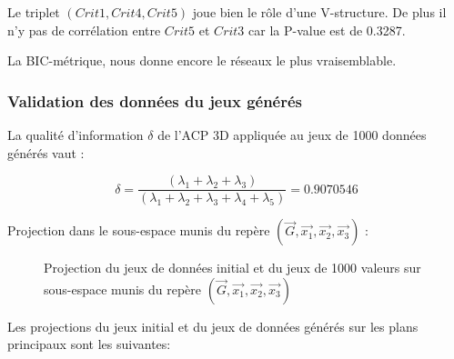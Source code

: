 \documentclass[a4paper]{article}
\begin{document}
\begin{appendices}
Le triplet $(Crit1,Crit4,Crit5)$ joue bien le rôle d'une V-structure. De plus il n'y pas de corrélation entre $Crit5$ et $Crit3$ car la P-value est de  0.3287.

La BIC-métrique, nous donne encore le réseaux le plus vraisemblable.

\subsubsection{Validation des données du jeux générés}

La qualité d'information $\delta$ de l'ACP 3D appliquée au jeux de 1000 données générés vaut  :

$$\delta=\frac{(\lambda_{1}+\lambda_{2}+\lambda_{3})}{(\lambda_{1}+\lambda_{2}+\lambda_{3}+\lambda_{4}+\lambda_{5})}=0.9070546$$

Projection dans le sous-espace munis du repère $(\vec{G},\vec{x_{1}},\vec{x_{2}},\vec{x_{3}})$ :

 \begin{figure}[H]
\hfill
{}
\caption{Projection du jeux de données initial et du jeux de 1000 valeurs sur sous-espace munis du repère $(\vec{G},\vec{x_{1}},\vec{x_{2}},\vec{x_{3}})$}\label{fig:somefiglabel}
\end{figure}

Les projections du jeux initial et du jeux de données générés sur les plans principaux sont les suivantes:


\end{appendices}
\end{document}
